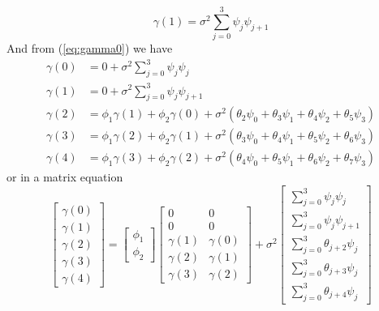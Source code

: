 \documentclass[11pt, oneside]{article}   	%
\begin{document}
\begin{equation}
\gamma(1) =  \sigma^{2}\sum_{j=0}^{3}\psi_{j}\psi_{j+1}
\end{equation}
And from (\ref{eq:gamma0}) we have 
\begin{equation}
\begin{aligned}
\gamma(0) &= 0 + \sigma^{2}\sum_{j=0}^{3}\psi_{j}\psi_{j}\\
\gamma(1) &= 0 + \sigma^{2}\sum_{j=0}^{3}\psi_{j}\psi_{j+1}\\
\gamma(2) &= \phi_{1}\gamma(1) + \phi_{2}\gamma(0) + \sigma^{2}(\theta_{2}\psi_{0} + \theta_{3}\psi_{1} + \theta_{4}\psi_{2}+\theta_{5}\psi_{3} )\\
\gamma(3) &= \phi_{1}\gamma(2) + \phi_{2}\gamma(1) + \sigma^{2}(\theta_{3}\psi_{0} + \theta_{4}\psi_{1} + \theta_{5}\psi_{2}+\theta_{6}\psi_{3} )\\
\gamma(4) &= \phi_{1}\gamma(3) + \phi_{2}\gamma(2) + \sigma^{2}(\theta_{4}\psi_{0} + \theta_{5}\psi_{1} + \theta_{6}\psi_{2}+\theta_{7}\psi_{3} )
\end{aligned}
\end{equation}
or in a matrix equation
\begin{equation}
\left[
 \begin{array}{c}
  \gamma(0) \\ \gamma(1)  \\ \gamma(2)  \\ \gamma(3)  \\ \gamma(4)  
  \end{array}
   \right] = 
   \left[ 
   \begin{array}{c}
    \phi_{1} \\ \phi_{2} 
  \end{array}
  \right]
   \begin{bmatrix}
    0 & 0 \\ 0 & 0 \\ \gamma(1) & \gamma(0) \\ \gamma(2) & \gamma(1) \\ \gamma(3) & \gamma(2)
     \end{bmatrix} 
     +\sigma^{2}
     \left[ 
   \begin{array}{c}
    \sum_{j=0}^{3}\psi_{j}\psi_{j} \\  \sum_{j=0}^{3}\psi_{j}\psi_{j+1} \\\sum_{j=0}^{3}\theta_{j+2}\psi_{j}\\\sum_{j=0}^{3}\theta_{j+3}\psi_{j}\\\sum_{j=0}^{3}\theta_{j+4}\psi_{j}
  \end{array}
  \right]
\end{equation}
\end{document}
